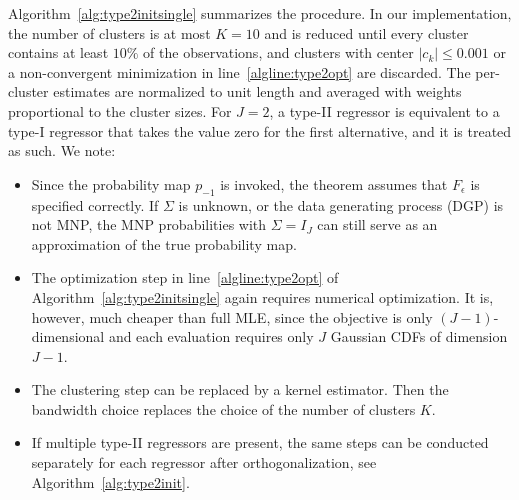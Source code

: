 \documentclass[preprint,12pt,authoryear]{elsarticle}
\begin{document}
Algorithm~\ref{alg:type2initsingle} summarizes the procedure. In our implementation, the number of clusters is at most $K = 10$ and is reduced until every cluster contains at least $10\%$ of the observations, and clusters with center $\lvert c_k \rvert \leq 0.001$ or a non-convergent minimization in line~\ref{algline:type2opt} are discarded. The per-cluster estimates are normalized to unit length and averaged with weights proportional to the cluster sizes. For $J = 2$, a type-II regressor is equivalent to a type-I regressor that takes the value zero for the first alternative, and it is treated as such. We note:
%
\begin{itemize}
    \item Since the probability map $p_{-1}$ is invoked, the theorem assumes that $F_\epsilon$ is specified correctly. If $\Sigma$ is unknown, or the data generating process (DGP) is not MNP, the MNP probabilities with $\Sigma = I_J$ can still serve as an approximation of the true probability map.
    \item The optimization step in line~\ref{algline:type2opt} of Algorithm~\ref{alg:type2initsingle} again requires numerical optimization. It is, however, much cheaper than full MLE, since the objective is only $(J-1)$-dimensional and each evaluation requires only $J$ Gaussian CDFs of dimension $J-1$.
    \item The clustering step can be replaced by a kernel estimator. Then the bandwidth choice replaces the choice of the number of clusters $K$.
    \item If multiple type-II regressors are present, the same steps can be conducted separately for each regressor after orthogonalization, see Algorithm~\ref{alg:type2init}.
\end{itemize}
\end{document}

